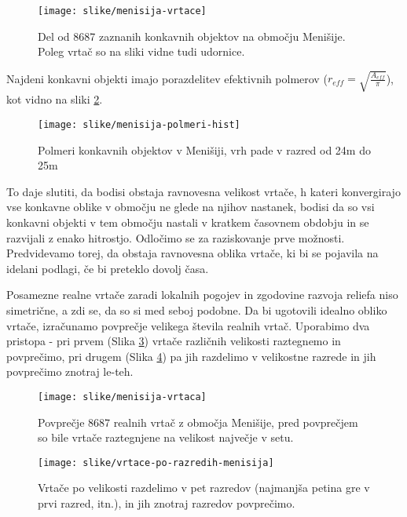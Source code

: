 \documentclass[a4paper, oneside, 12pt]{book}
\begin{document}
  \begin{figure}[H]
    \begin{center}
      \texttt{[image: slike/menisija-vrtace]}
    \end{center}
    \caption{Del od 8687 zaznanih konkavnih objektov na območju Menišije. Poleg vrtač so na sliki vidne tudi udornice.}
    \label{fig:menisija-vrtace}
  \end{figure}

  Najdeni konkavni objekti imajo porazdelitev efektivnih polmerov (\mbox{$r_{eff}=\sqrt{\frac{A_{eff}}{\pi}}$}), kot vidno na sliki \ref{fig:menisija-polmeri-hist}.

  \begin{figure}[H]
    \centering
    \texttt{[image: slike/menisija-polmeri-hist]}
    \caption{Polmeri konkavnih objektov v Menišiji, vrh pade v razred od 24m do 25m}
    \label{fig:menisija-polmeri-hist}
  \end{figure}

  To daje slutiti, da bodisi obstaja ravnovesna velikost vrtače, h kateri konvergirajo vse konkavne oblike v območju ne glede na njihov nastanek, bodisi da so vsi konkavni objekti v tem območju nastali v kratkem časovnem obdobju in se razvijali z enako hitrostjo. Odločimo se za raziskovanje prve možnosti.
  Predvidevamo torej, da obstaja ravnovesna oblika vrtače, ki bi se pojavila na idelani podlagi, če bi preteklo dovolj časa.

  Posamezne realne vrtače zaradi lokalnih pogojev in zgodovine razvoja reliefa niso simetrične, a zdi se, da so si med seboj podobne. Da bi ugotovili idealno obliko vrtače, izračunamo povprečje velikega števila realnih vrtač. Uporabimo dva pristopa - pri prvem (Slika \ref{fig:menisija-vrtaca}) vrtače različnih velikosti raztegnemo in povprečimo, pri drugem (Slika \ref{fig:menisija-vrtace-po-razredih}) pa jih razdelimo v velikostne razrede in jih povprečimo znotraj le-teh. 

  \begin{figure}[H]
    \centering
    \texttt{[image: slike/menisija-vrtaca]}
    \caption{Povprečje 8687 realnih vrtač z območja Menišije, pred povprečjem so bile vrtače raztegnjene na velikost največje v setu.}
    \label{fig:menisija-vrtaca}
  \end{figure}

  \begin{figure}
    \centering
    \texttt{[image: slike/vrtace-po-razredih-menisija]}
    \caption{Vrtače po velikosti razdelimo v pet razredov (najmanjša petina gre v prvi razred, itn.), in jih znotraj razredov povprečimo.}
    \label{fig:menisija-vrtace-po-razredih}
  \end{figure}
\end{document}
